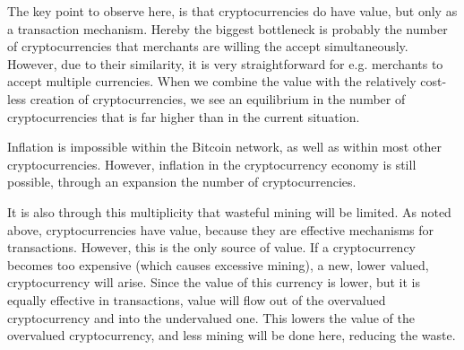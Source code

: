 The key point to observe here, is that cryptocurrencies do have value,
but only as a transaction mechanism. Hereby the biggest bottleneck
is probably the number of cryptocurrencies that merchants are willing
the accept simultaneously. However, due to their similarity, it is
very straightforward for e.g. merchants to accept multiple currencies.
When we combine the value with the relatively cost-less creation of
cryptocurrencies, we see an equilibrium in the number of cryptocurrencies
that is far higher than in the current situation.

Inflation is impossible within the Bitcoin network, as well as within
most other cryptocurrencies. However, inflation in the cryptocurrency
economy is still possible, through an expansion the number of cryptocurrencies.

It is also through this multiplicity that wasteful mining will be
limited. As noted above, cryptocurrencies have value, because they
are effective mechanisms for transactions. However, this is the only
source of value. If a cryptocurrency becomes too expensive (which
causes excessive mining), a new, lower valued, cryptocurrency will
arise. Since the value of this currency is lower, but it is equally
effective in transactions, value will flow out of the overvalued cryptocurrency
and into the undervalued one. This lowers the value of the overvalued
cryptocurrency, and less mining will be done here, reducing the waste.
